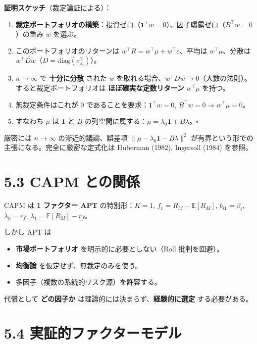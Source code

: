 \documentclass[11pt,a4paper]{report}
\begin{document}
\textbf{証明スケッチ}（裁定論証による）：

\begin{enumerate}
\item \textbf{裁定ポートフォリオの構築}：投資ゼロ（$\mathbf{1}^\top w = 0$）、因子曝露ゼロ（$B^\top w = 0$）の重み $w$ を選ぶ。
\item このポートフォリオのリターンは $w^\top R = w^\top \mu + w^\top \varepsilon$、平均は $w^\top \mu$、分散は $w^\top D w$（$D = \mathrm{diag}(\sigma_{\varepsilon_i}^2)$）。
\item $n \to \infty$ で \textbf{十分に分散} された $w$ を取れる場合、$w^\top D w \to 0$（大数の法則）。すると裁定ポートフォリオは \textbf{ほぼ確実な定数リターン} $w^\top \mu$ を持つ。
\item 無裁定条件はこれが $0$ であることを要求：$\mathbf{1}^\top w = 0$, $B^\top w = 0 \Rightarrow w^\top \mu = 0$。
\item すなわち $\mu$ は $\mathbf{1}$ と $B$ の列空間に属する：$\mu = \lambda_0 \mathbf{1} + B \lambda$。$\square$
\end{enumerate}

厳密には $n \to \infty$ の漸近的議論、誤差項 $\|\mu - \lambda_0\mathbf{1} - B\lambda\|^2$ が有界という形での主張になる。完全に厳密な定式化は Huberman (1982), Ingersoll (1984) を参照。

\section{5.3 CAPM との関係}

CAPM は \textbf{1 ファクター APT} の特別形：$K = 1$, $f_1 = R_M - \mathbb{E}[R_M]$, $b_{i1} = \beta_i$, $\lambda_0 = r_f$, $\lambda_1 = \mathbb{E}[R_M] - r_f$。

しかし APT は

\begin{itemize}
\item \textbf{市場ポートフォリオ} を明示的に必要としない（Roll 批判を回避）。
\item \textbf{均衡論} を仮定せず、無裁定のみを使う。
\item 多因子（複数の系統的リスク源）を許容する。
\end{itemize}

代償として \textbf{どの因子か} は理論的には決まらず、\textbf{経験的に選定} する必要がある。

\section{5.4 実証的ファクターモデル}
\end{document}
